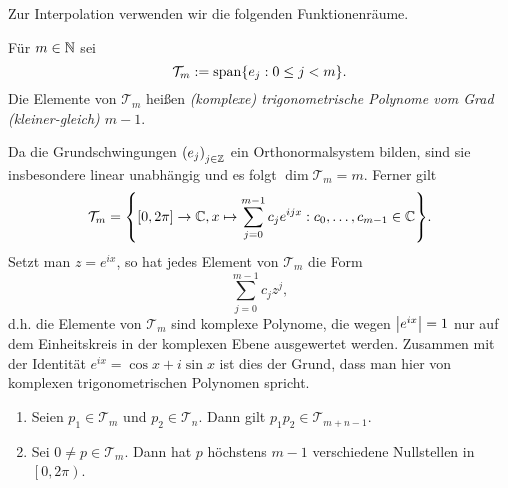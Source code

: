 \documentclass{lecture}
\begin{document}
    Zur Interpolation verwenden wir die folgenden Funktionenräume.
    \begin{definition}
        Für \(m \in \N\) sei
        \[
            \mathcal{T}_m := \setspan\braces*{e_j : 0 \le j < m}.
        \]
        Die Elemente von \(\mathcal{T}_m\) heißen \emph{(komplexe) trigonometrische Polynome vom Grad (kleiner-gleich) \(m - 1\)}.
    \end{definition}
    \begin{remark}
        Da die Grundschwingungen \(\parentheses*{e_j}_{j \in \Z}\) ein Orthonormalsystem bilden, sind sie insbesondere linear unabhängig und es folgt \(\dim\mathcal{T}_m = m\).
        Ferner gilt
        \[
            \mathcal{T}_m = \braces*{\brackets*{0, 2\pi} \to \C, x \mapsto \sum_{j = 0}^{m - 1}c_j e^{ijx} : c_0, \ldots, c_{m - 1} \in \C}.
        \]
        Setzt man \(z = e^{ix}\), so hat jedes Element von \(\mathcal{T}_m\) die Form
        \[
            \sum_{j = 0}^{m - 1}c_j z^j,
        \]
        d.h. die Elemente von \(\mathcal{T}_m\) sind komplexe Polynome, die wegen \(\absolute*{e^{ix}} = 1\) nur auf dem Einheitskreis in der komplexen Ebene ausgewertet werden.
        Zusammen mit der Identität \(e^{ix} = \cos x + i\sin x\) ist dies der Grund, dass man hier von komplexen trigonometrischen Polynomen spricht.
    \end{remark}
    \begin{theorem}
        \begin{enumerate}
            \item Seien \(p_1 \in \mathcal{T}_m\) und \(p_2 \in \mathcal{T}_n\).
            Dann gilt \(p_1 p_2 \in \mathcal{T}_{m + n - 1}\).
            \item Sei \(0 \ne p \in \mathcal{T}_m\).
            Dann hat \(p\) höchstens \(m -1\) verschiedene Nullstellen in \(\left[0, 2\pi\right)\).
        \end{enumerate}
    \end{theorem}
\end{document}
